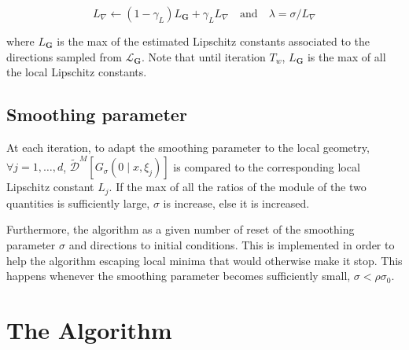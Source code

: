 \begin{equation}\label{learning rate}
     L_{\nabla} \leftarrow\left(1-\gamma_{L}\right) L_{\mathbf{G}}+\gamma_{L} L_{\nabla} \quad \text{and} \quad \lambda=\sigma / L_{\nabla}
\end{equation}

where $L_{\mathbf{G}}$ is the max of the estimated Lipschitz constants associated to the directions sampled from $\mathcal{L}_{\mathbf{G}}$. Note that until iteration $T_w$, $L_{\mathbf{G}}$ is the max of all the local Lipschitz constants.

\subsection{Smoothing parameter}
 
At each iteration, to adapt the smoothing parameter to the local geometry, $\forall j=1,\dots,d$, $\widetilde{\mathcal{D}}^{M}\left[G_{\sigma}\left(0 \mid x, \xi_{j}\right)\right]$ is compared to the corresponding local Lipschitz constant $L_j$. If the max of all the ratios of the module of the two quantities is sufficiently large, $\sigma$ is increase, else it is increased.

Furthermore, the algorithm as a given number of reset of the smoothing parameter $\sigma$ and directions to initial conditions. This is implemented in order to help the algorithm escaping local minima that would otherwise make it stop. This happens whenever the smoothing parameter becomes sufficiently small, $\sigma < \rho \sigma_0$.


\section{The Algorithm}\label{sect:2_4} 

